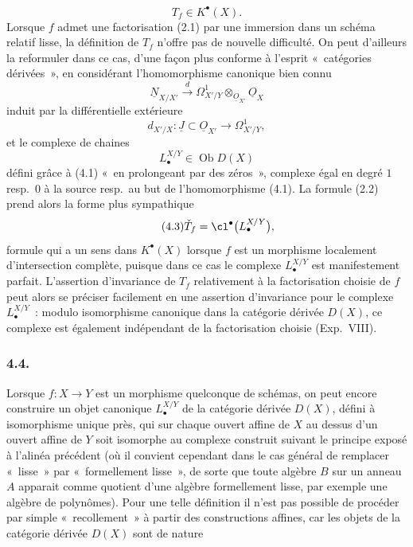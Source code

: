\[
T_f\in K^\bullet(X).
\]
Lorsque $f$ admet une factorisation (2.1) par une immersion dans un sch\'ema relatif lisse, la d\'efinition de $T_f$ n'offre pas de nouvelle difficult\'e. On peut d'ailleurs la reformuler dans ce cas, d'une fa\c{c}on plus conforme \`a l'esprit «~cat\'egories d\'eriv\'ees~», en consid\'erant l'homomorphisme canonique bien connu
\begin{equation}\tag{4.1}
\underline N_{X/X'}\xrightarrow{d}\Omega^1_{X'/Y}\otimes_{\underline O_{X'}}\underline O_X
\end{equation}
induit par la diff\'erentielle ext\'erieure
\[
d_{X'/X}:\underline J\subset\underline O_{X'}\longrightarrow\Omega^1_{X'/Y},
\]
et le complexe de chaines
\begin{equation}\tag{4.2}
L^{X/Y}_\bullet\in\operatorname{Ob}D(X)
\end{equation}
d\'efini gr\^ace \`a (4.1) «~en prolongeant par des z\'eros~», complexe \'egal en degr\'e $1$ resp.\ $0$ \`a la source resp.\ au but de l'homomorphisme (4.1). La formule (2.2) prend alors la forme plus sympathique
\begin{equation}\tag{4.3}
\check T_f=\cl^\bullet\bigl(L^{X/Y}_\bullet\bigr),
\end{equation}
formule qui a un sens dans $K^\bullet(X)$ lorsque $f$ est un morphisme localement d'intersection compl\`ete, puisque dans ce cas le complexe $L^{X/Y}_\bullet$ est manifestement parfait. L'assertion d'invariance de $T_f$ relativement \`a la factorisation choisie de $f$ peut alors se pr\'eciser facilement en une assertion d'invariance pour le complexe $L^{X/Y}_\bullet$~: modulo isomorphisme canonique dans la cat\'egorie d\'eriv\'ee $D(X)$, ce complexe est \'egalement ind\'ependant de la factorisation choisie (Exp.\ VIII).

\subsubsection*{4.4.}
Lorsque $f:X\to Y$ est un morphisme quelconque de sch\'emas, on peut encore construire un objet canonique $L^{X/Y}_\bullet$ de la cat\'egorie d\'eriv\'ee $D(X)$, d\'efini \`a isomorphisme unique pr\`es, qui sur chaque ouvert affine de $X$ au dessus d'un ouvert affine de $Y$ soit isomorphe au complexe construit suivant le principe expos\'e \`a l'alin\'ea pr\'ec\'edent (o\`u il convient cependant dans le cas g\'en\'eral de remplacer «~lisse~» par «~formellement lisse~», de sorte que toute alg\`ebre $B$ sur un anneau $A$ apparait comme quotient d'une alg\`ebre formellement lisse, par exemple une alg\`ebre de polyn\^omes). Pour une telle d\'efinition il n'est pas possible de proc\'eder par simple «~recollement~» \`a partir des constructions affines, car les objets de la cat\'egorie d\'eriv\'ee $D(X)$ sont de nature
